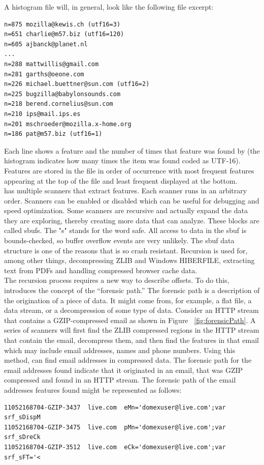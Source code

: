 \documentclass[11pt]{article} %
\begin{document}
A histogram file will, in general, look like the following file excerpt:
\lstset{style=customfile}
\begin{lstlisting}
n=875 mozilla@kewis.ch (utf16=3)
n=651 charlie@m57.biz (utf16=120)
n=605 ajbanck@planet.nl
...
n=288 mattwillis@gmail.com
n=281 garths@oeone.com
n=226 michael.buettner@sun.com (utf16=2)
n=225 bugzilla@babylonsounds.com
n=218 berend.cornelius@sun.com
n=210 ips@mail.ips.es
n=201 mschroeder@mozilla.x-home.org
n=186 pat@m57.biz (utf16=1)
\end{lstlisting}
Each line shows a feature and the number of times that feature was found by \bulk (the histogram indicates how many times the item was found coded as UTF-16). Features are stored in the file in order of occurrence with most frequent features appearing at the top of the file and least frequent displayed at the bottom. \\

\bulk has multiple scanners that extract features. Each scanner runs in an arbitrary order. Scanners can be enabled or disabled which can be useful for debugging and speed optimization. Some scanners are recursive and actually expand the data they are exploring, thereby creating more data that \bulk can analyze. These blocks are called sbufs. The "s" stands for the word safe. All access to data in the sbuf is bounds-checked, so buffer overflow events are very unlikely. The sbuf data structure is one of the reasons that \bulk is so crash resistant. Recursion is used for, among other things, decompressing ZLIB and Windows HIBERFILE, extracting text from PDFs and handling compressed browser cache data. \\

The recursion process requires a new way to describe offsets. To do this, \bulk introduces the concept of the ``forensic path.'' The forensic path is a description of the origination of a piece of data. It might come from, for example, a flat file, a data stream, or a decompression of some type of data. Consider an HTTP stream that contains a GZIP-compressed email as shown in Figure ~\ref{fig:forensicPath}. A series of scanners will first find the ZLIB compressed regions in the HTTP stream that contain the email, decompress them, and then find the features in that email which may include email addresses, names and phone numbers. Using this method, \bulk can find email addresses in compressed data. The forensic path for the email addresses found indicate that it originated in an email, that was GZIP compressed and found in an HTTP stream. The forensic path of the email addresses features found might be represented as follows:
\lstset{style=customfile}
\begin{lstlisting}
11052168704-GZIP-3437  live.com  eMn='domexuser@live.com';var  srf_sDispM
11052168704-GZIP-3475  live.com  pMn='domexuser@live.com';var  srf_sDreCk
11052168704-GZIP-3512  live.com  eCk='domexuser@live.com';var  srf_sFT='<
\end{lstlisting}
\end{document}
